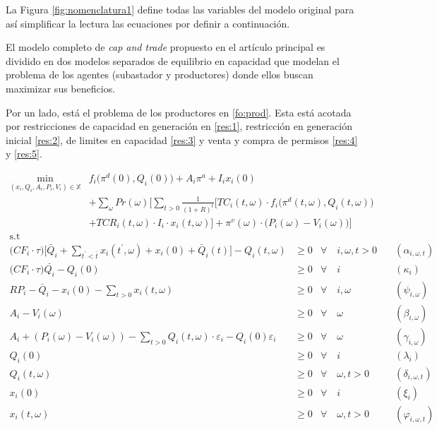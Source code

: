 La Figura \ref{fig:nomenclatura1} define todas las variables del modelo original para así simplificar la lectura las ecuaciones por definir a continuación.
\vspace{2.5mm}

El modelo completo de \textit{cap and trade} propuesto en el artículo principal es dividido en dos modelos separados de equilibrio en capacidad que modelan el problema de los agentes (subastador y productores) donde ellos buscan maximizar sus beneficios.
\vspace{2.5mm}

Por un lado, está el problema de los productores en \ref{fo:prod}. Esta está acotada por restricciones de capacidad en generación en \ref{res:1}, restricción en generación inicial \ref{res:2}, de limites en capacidad \ref{res:3} y venta y compra de permisos \ref{res:4} y \ref{res:5}. 

\begin{align}
\min_{(x_i,Q_i,A_i,P_i,V_i)\in \mathbb{X}} &  f_i \big( \pi^d(0),Q_i(0)\big)+ A_i \pi^{a} + I_i x_i(0) \nonumber \\ 
& + \sum_{\omega} Pr(\omega)   \Bigg[ \sum_{t>0} \frac{1}{(1+R)^t} \Big[ TC_i(t,\omega)\cdot f_i \big( \pi^d(t,\omega),Q_i(t,\omega) \big)  \nonumber \\
 & + TCR_i(t,\omega) \cdot I_i\cdot x_i(t,\omega) \Big] + \pi^v(\omega)\cdot \big(P_i(\omega)-V_i(\omega)\big) \Bigg]  \label{fo:prod}\\
     \textrm{s.t \ } \nonumber
\end{align}
\begin{align}
    \Big(CF_i \cdot\tau\Big)  \Bigg[\bar{Q}_i + \sum_{t^{\prime}<\bar{t}} x_i(t^\prime,\omega) + x_i(0)+ \bar{Q}_i(t) \Bigg] - Q_i(t,\omega) & \geq 0  & \forall  \quad i,\omega, t  > 0 & \quad (\alpha_{i,\omega,t})\label{res:1}\\
    \Big(CF_i\cdot\tau \Big)\bar{Q_i}-Q_{i}(0) & \geq 0  & \forall  \quad i & \quad (\kappa_i) \label{res:2}\\
     RP_i - \bar{Q}_i  - x_i(0) - \sum_{t > 0} x_i(t,\omega) & \geq 0 &  \forall \quad i,\omega &   \quad (\psi_{i,\omega}) \label{res:3}\\
 A_{i} -V_i(\omega) & \geq  0  & \forall  \quad \omega & \quad (\beta_{i,\omega}) \label{res:4}\\
 A_{i} + (P_i(\omega) - V_i(\omega))-\sum_{t>0}Q_i(t, \omega)\cdot \varepsilon_{i}-Q_i(0)\varepsilon_{i} & \geq  0  &\forall \quad \omega & \quad (\gamma_{i,\omega})\label{res:5}\\
 Q_i(0) & \geq  0 & \forall \quad i & \quad (\lambda_i) \label{res:q0}\\ 
 Q_i(t, \omega) & \geq  0   & \forall \quad \omega, t >0 & \quad (\delta_{i,\omega,t})\label{res:qt}\\
  x_i(0) & \geq  0 & \forall  \quad i & \quad (\xi_i)  \label{res:capi0}\\ 
  x_i(t, \omega) & \geq  0   & \forall  \quad \omega, t >0 & \quad (\varphi_{i,\omega,t})\label{res:capt}
  \end{align}

